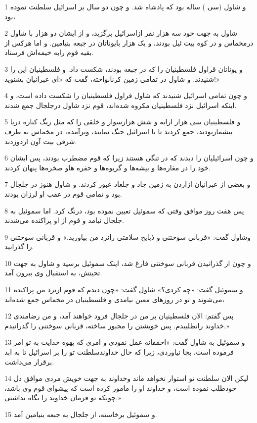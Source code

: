 \par 1 و شاول (سی ) ساله بود که پادشاه شد. و چون دو سال بر اسرائیل سلطنت نموده بود،
\par 2 شاول به جهت خود سه هزار نفر ازاسرائیل برگزید، و از ایشان دو هزار با شاول درمخماس و در کوه بیت ئیل بودند، و یک هزار بایوناتان در جبعه بنیامین. و اما هرکس از بقیه قوم رابه خیمه‌اش فرستاد.
\par 3 و یوناتان قراول فلسطینیان را که در جبعه بودند، شکست داد. و فلسطینیان این را شنیدند. و شاول در تمامی زمین کرنانواخته، گفت که «ای عبرانیان بشنوید!»
\par 4 و چون تمامی اسرائیل شنیدند که شاول قراول فلسطینیان را شکست داده است، و اینکه اسرائیل نزد فلسطینیان مکروه شده‌اند، قوم نزد شاول درجلجال جمع شدند.
\par 5 و فلسطینیان سی هزار ارابه و شش هزارسوار و خلقی را که مثل ریگ کناره دریا بیشماربودند، جمع کردند تا با اسرائیل جنگ نمایند، وبرآمده، در مخماس به طرف شرقی بیت آون اردوزدند.
\par 6 و چون اسرائیلیان را دیدند که در تنگی هستند زیرا که قوم مضطرب بودند، پس ایشان خود را در مغاره‌ها و بیشه‌ها و گریوه‌ها و حفره هاو صخره‌ها پنهان کردند.
\par 7 و بعضی از عبرانیان ازاردن به زمین جاد و جلعاد عبور کردند. و شاول هنوز در جلجال بود و تمامی قوم در عقب او لرزان بودند.
\par 8 پس هفت روز موافق وقتی که سموئیل تعیین نموده بود، درنگ کرد. اما سموئیل به جلجال نیامد و قوم از او پراکنده می‌شدند.
\par 9 وشاول گفت: «قربانی سوختنی و ذبایح سلامتی رانزد من بیاورید.» و قربانی سوختنی را گذرانید.
\par 10 و چون از گذرانیدن قربانی سوختنی فارغ شد، اینک سموئیل برسید و شاول به جهت تحیتش، به استقبال وی بیرون آمد.
\par 11 و سموئیل گفت: «چه کردی؟» شاول گفت: «چون دیدم که قوم ازنزد من پراکنده می‌شوند و تو در روزهای معین نیامدی و فلسطینیان در مخماس جمع شده‌اند،
\par 12 پس گفتم: الان فلسطینیان بر من در جلجال فرود خواهند آمد، و من رضامندی خداوند رانطلبیدم. پس خویشتن را مجبور ساخته، قربانی سوختنی را گذرانیدم.»
\par 13 و سموئیل به شاول گفت: «احمقانه عمل نمودی و امری که یهوه خدایت به تو امر فرموده است، بجا نیاوردی، زیرا که حال خداوندسلطنت تو را بر اسرائیل تا به ابد برقرار می‌داشت.
\par 14 لیکن الان سلطنت تو استوار نخواهد ماند وخداوند به جهت خویش مردی موافق دل خودطلب نموده است، و خداوند او را مامور کرده است که پیشوای قوم وی باشد، چونکه تو فرمان خداوند را نگاه نداشتی.»
\par 15 و سموئیل برخاسته، از جلجال به جبعه بنیامین آمد.
